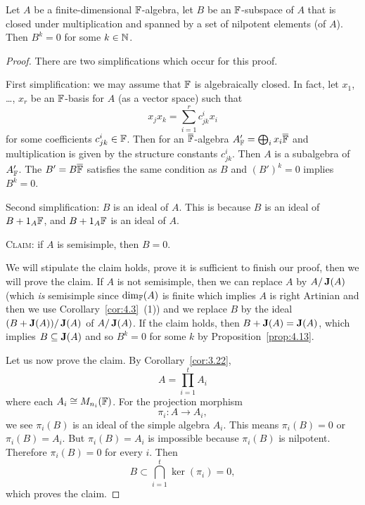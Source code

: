 \begin{proposition}\label{prop:4.18}
Let $A$ be a finite-dimensional $\mathbb{F}$-algebra, let $B$ be an
$\mathbb{F}$-subspace of $A$ that is closed under multiplication and spanned
by a set of nilpotent elements (of $A$). Then $B^{k}=0$ for some $k\in\mathbb{N}$.
\end{proposition}

\begin{proof}
There are two simplifications which occur for this proof.
  
First simplification: we may assume that $\mathbb{F}$ is algebraically closed. In fact, let
$x_{1}$, \dots, $x_{r}$ be an $\mathbb{F}$-basis for $A$ (as a vector space)
such that
\begin{equation}
x_{j}x_{k}=\sum^{r}_{i=1}c^{i}_{jk}x_{i}
\end{equation}
for some coefficients $c^{i}_{jk}\in\mathbb{F}$. Then for an
$\overline{\mathbb{F}}$-algebra $A'_{\mathbb{F}}=\bigoplus_{i} x_{i}\overline{\mathbb{F}}$ and
multiplication is given by the structure constants $c^{i}_{jk}$. Then
$A$ is a subalgebra of $A'_{\mathbb{F}}$. The $B'=B\overline{\mathbb{F}}$ satisfies
the same condition as $B$ and $(B')^{k}=0$ implies $B^{k}=0$.

Second simplification: $B$ is an ideal of $A$. This is because $B$ is
an ideal of $B+1_{A}\mathbb{F}$, and $B+1_{A}\mathbb{F}$ is an ideal of $A$.

\textsc{Claim:} if $A$ is semisimple, then $B=0$.

We will stipulate the claim holds, prove it is sufficient to finish
our proof, then we will prove the claim. If $A$ is not
semisimple, then we can replace $A$ by $A/\operatorname{\textup{\textbf{J}}}(A)$ (which
\emph{is} semisimple since $\dim_{\mathbb{F}}(A)$ is finite which implies $A$
is right Artinian and then we use Corollary~\ref{cor:4.3}~(1)) and we replace $B$ by the ideal
$(B+\operatorname{\textup{\textbf{J}}}(A))/\operatorname{\textup{\textbf{J}}}(A)$ of $A/\operatorname{\textup{\textbf{J}}}(A)$. If the claim
holds, then $B+\operatorname{\textup{\textbf{J}}}(A)=\operatorname{\textup{\textbf{J}}}(A)$, which implies
$B\subseteq\operatorname{\textup{\textbf{J}}}(A)$ and so $B^{k}=0$ for some $k$ by
Proposition~\ref{prop:4.13}.

Let us now prove the claim. By Corollary~\ref{cor:3.22},
\begin{equation}
A=\prod^{t}_{i=1}A_{i}
\end{equation}
where each $A_{i}\cong M_{n_{i}}(\mathbb{F})$. For the projection morphism
\begin{equation}
\pi_{i}\colon A\to A_{i},
\end{equation}
we see $\pi_{i}(B)$ is an ideal of the simple algebra $A_{i}$. This
means $\pi_{i}(B)=0$ or $\pi_{i}(B)=A_{i}$. But $\pi_{i}(B)=A_{i}$ is
impossible because $\pi_{i}(B)$ is nilpotent. Therefore $\pi_{i}(B)=0$
for every $i$. Then
\begin{equation}
B\subset\bigcap^{t}_{i=1}\ker(\pi_{i})=0,
\end{equation}
which proves the claim.
\end{proof}